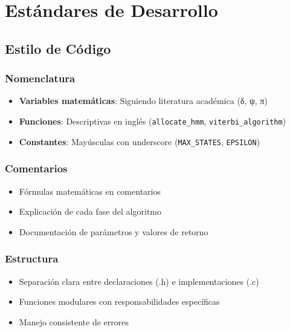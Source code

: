 \documentclass[
]{article}
\providecommand{\tightlist}{%
  \setlength{\itemsep}{0pt}\setlength{\parskip}{0pt}}
\begin{document}
\section{Estándares de Desarrollo}\label{estuxe1ndares-de-desarrollo}

\subsection{Estilo de Código}\label{estilo-de-cuxf3digo}

\subsubsection{Nomenclatura}\label{nomenclatura}

\begin{itemize}
\tightlist
\item
  \textbf{Variables matemáticas}: Siguiendo literatura académica (δ, ψ,
  π)
\item
  \textbf{Funciones}: Descriptivas en inglés (\texttt{allocate\_hmm},
  \texttt{viterbi\_algorithm})
\item
  \textbf{Constantes}: Mayúsculas con underscore (\texttt{MAX\_STATES},
  \texttt{EPSILON})
\end{itemize}

\subsubsection{Comentarios}\label{comentarios}

\begin{itemize}
\tightlist
\item
  Fórmulas matemáticas en comentarios
\item
  Explicación de cada fase del algoritmo
\item
  Documentación de parámetros y valores de retorno
\end{itemize}

\subsubsection{Estructura}\label{estructura}

\begin{itemize}
\tightlist
\item
  Separación clara entre declaraciones (.h) e implementaciones (.c)
\item
  Funciones modulares con responsabilidades específicas
\item
  Manejo consistente de errores
\end{itemize}
\end{document}
